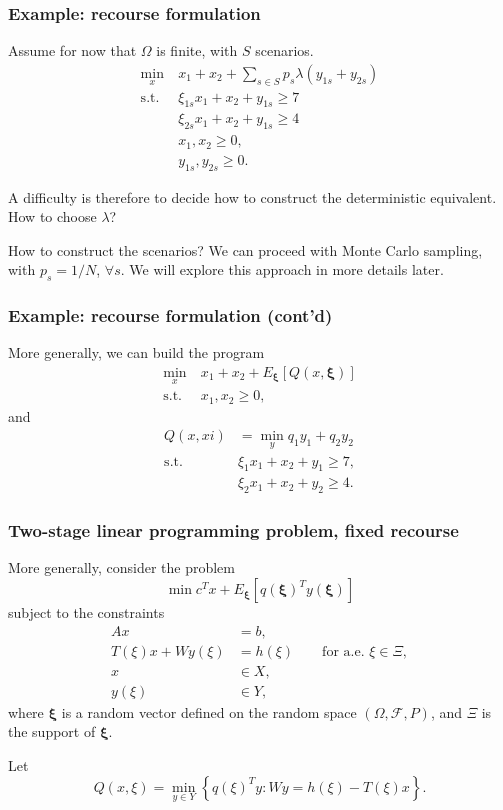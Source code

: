 \documentclass{beamer}
\def\bxi{\boldsymbol\xi}
\def\bxi{\boldsymbol\xi}
\begin{document}
\begin{frame}
	\frametitle{Example: recourse formulation}
	
	Assume for now that $\Omega$ is finite, with $S$ scenarios.
	\begin{align*}
	\min_x\ & x_1+x_2 + \sum_{s \in S} p_s \lambda (y_{1s} + y_{2s})\\
	\mbox{s.t. } & \xi_{1s}x_1 + x_2 + y_{1s} \geq 7 \\
	& \xi_{2s}x_1 + x_2 + y_{1s} \geq 4 \\
	& x_1, x_2 \geq 0,\\
	& y_{1s}, y_{2s} \geq 0.
	\end{align*}
	
	A difficulty is therefore to decide how to construct the deterministic equivalent.
	How to choose $\lambda$?
	
	\mbox{}
	
	How to construct the scenarios?
	We can proceed with Monte Carlo sampling, with $p_s = 1/N$, $\forall s$.
	We will explore this approach in more details later.
	
\end{frame}

\begin{frame}
	\frametitle{Example: recourse formulation (cont'd)}
	
	More generally, we can build the program
	\begin{align*}
	\min_x\ & x_1+x_2 + E_{\bxi}[Q(x,\bxi)] \\
	\mbox{s.t. } & x_1, x_2 \geq 0,
	\end{align*}
	and
	\begin{align*}
	Q(x,xi) &= \min_y q_1y_1 + q_2y_2 \\
	\mbox{s.t. } & \xi_1 x_1 + x_2 + y_1 \geq 7, \\
	& \xi_2 x_1 + x_2 + y_2 \geq 4.
	\end{align*}
	
\end{frame}

\begin{frame}
\frametitle{Two-stage linear programming problem, fixed recourse}

More generally, consider the problem
\[
\min c^Tx + E_{\bxi}[q(\bxi)^Ty(\bxi)]
\]
subject to the constraints
\begin{align*}
Ax &= b, \\
T(\xi)x + Wy(\xi) &= h(\xi) \qquad \text{for a.e. } \xi \in \Xi, \\
x & \in X, \\
y(\xi) & \in Y,
\end{align*}
where $\bxi$ is a random vector defined on the random space 
$(\Omega, \mathcal{F}, P)$, and $\Xi$ is the support of $\bxi$.

\mbox{}

Let
\[
Q(x, \xi) = \min_{y \in Y} \left\lbrace q(\xi)^Ty: Wy = h(\xi) - T(\xi)x \right\rbrace.
\]
\end{frame}
\end{document}
